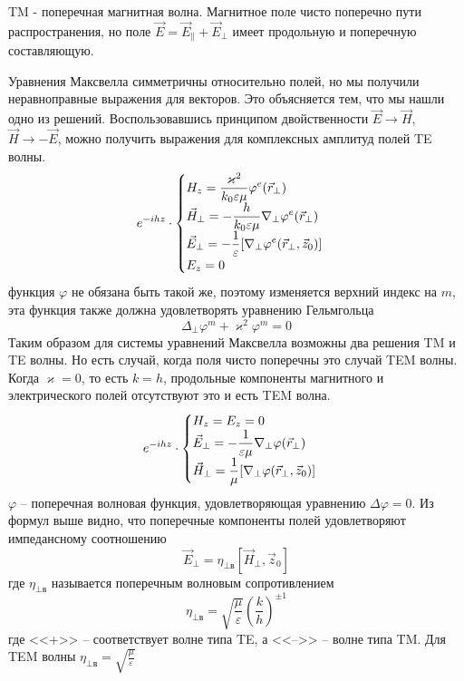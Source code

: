 \documentclass[a4paper,14pt]{extarticle}
\renewcommand{\phi}{\varphi}
\renewcommand{\epsilon}{\varepsilon}
\renewcommand{\kappa}{\varkappa}
\begin{document}
	TM - поперечная магнитная волна. Магнитное поле чисто поперечно пути распространения, но поле $\vec{E}=\vec{E}_\parallel+\vec{E}_\perp$ имеет продольную и поперечную составляющую.
	
	Уравнения Максвелла симметричны относительно полей, но мы получили неравноправные выражения для векторов. Это объясняется тем, что мы нашли одно из решений. Воспользовавшись принципом двойственности $\vec{E}\to\vec{H}$, $\vec{H}\to -\vec{E}$, можно получить выражения  для комплексных амплитуд полей TE волны. 
	\begin{displaymath}
	e^{-ihz}\cdot
	\begin{cases}
	$$\displaystyle H_z = \frac{\kappa^2}{k_0\epsilon\mu}\phi^e(\vec{r}_\perp)$$ \\
	$$\displaystyle\vec{H}_\perp = -\frac{h}{k_0\epsilon\mu}\nabla_\perp\phi^e(\vec{r}_\perp)$$ \\
	$$\displaystyle\vec{E}_\perp = -\frac{1}{\epsilon}[\nabla_\perp\phi^e(\vec{r}_\perp,\vec{z}_0)]$$ \\
	$$\displaystyle E_z = 0$$
	\end{cases}
	\end{displaymath}
	функция $\phi$ не обязана быть такой же, поэтому изменяется верхний индекс на $m$, эта функция также должна удовлетворять уравнению Гельмгольца  
	$$\Delta_\perp\phi^{m} + \kappa^2\phi^{m}=0$$
	Таким образом для системы уравнений Максвелла возможны два решения TM и TE волны. Но есть случай, когда поля чисто поперечны это случай TEM волны.
	Когда $\kappa = 0$, то есть $k=h$, продольные компоненты магнитного и электрического полей отсутствуют это и есть TEM волна.
	\begin{displaymath}
	e^{-ihz}\cdot
	\begin{cases}
	$$\displaystyle H_z = E_z = 0$$ \\
	$$\displaystyle\vec{E}_\perp = -\frac{1}{\epsilon\mu}\nabla_\perp\phi(\vec{r}_\perp)$$ \\
	$$\displaystyle\vec{H}_\perp = \frac{1}{\mu}[\nabla_\perp\phi(\vec{r}_\perp,\vec{z}_0)]$$ 
	\end{cases}
	\end{displaymath}
	$\phi$ -- поперечная волновая функция, удовлетворяющая уравнению $\Delta\phi=0$.
	Из формул выше видно, что поперечные компоненты полей удовлетворяют импедансному соотношению
	$$\vec{E}_\perp = \eta_{\perp\text{в}}[\vec{H}_\perp,\vec{z}_0]$$
	где $\eta_{\perp\text{в}}$ называется поперечным волновым сопротивлением
	$$\eta_{\perp\text{в}}=\sqrt{\frac{\mu}{\epsilon}} \left( \frac{k}{h} \right)^{\pm 1}$$ 
	где <<+>> -- соответствует волне типа TE, а <<-->> -- волне типа TM. Для TEM волны $\displaystyle \eta_{\perp\text{в}}=\sqrt{\frac{\mu}{\epsilon}}$
	
\end{document}
